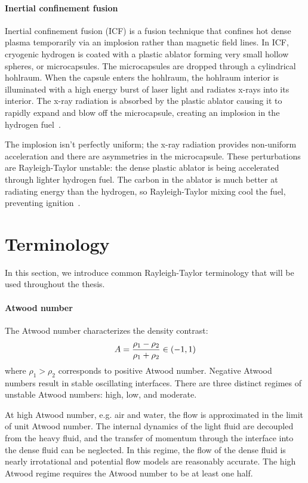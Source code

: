 \paragraph{Inertial confinement fusion}
Inertial confinement fusion (ICF) is a fusion technique that confines hot dense plasma temporarily via an implosion rather than magnetic field lines.
In ICF, cryogenic hydrogen is coated with a plastic ablator forming very small hollow spheres, or microcapsules.
The microcapsules are dropped through a cylindrical hohlraum.
When the capsule enters the hohlraum, the hohlraum interior is illuminated with a high energy burst of laser light and radiates x-rays into its interior.
The x-ray radiation is absorbed by the plastic ablator causing it to rapidly expand and blow off the microcapsule, creating an implosion in the hydrogen fuel~\cite{NASICF}.

The implosion isn't perfectly uniform; the x-ray radiation provides non-uniform acceleration and there are asymmetries in the microcapsule.
These perturbations are Rayleigh-Taylor unstable: the dense plastic ablator is being accelerated through lighter hydrogen fuel.
The carbon in the ablator is much better at radiating energy than the hydrogen, so Rayleigh-Taylor mixing cool the fuel, preventing ignition~\cite{goncharov2012panel}.

\section{Terminology}

In this section, we introduce common Rayleigh-Taylor terminology that will be used throughout the thesis.

\paragraph{Atwood number}
The Atwood number characterizes the density contrast:
\begin{equation} \elabel{atwood}
A = \frac{\rho_1 - \rho_2}{\rho_1 + \rho_2} \in (-1,1)
\end{equation}
where $\rho_1 > \rho_2$ corresponds to positive Atwood number.
Negative Atwood numbers result in stable oscillating interfaces.
There are three distinct regimes of unstable Atwood numbers: high, low, and moderate.

At high Atwood number, e.g. air and water, the flow is approximated in the limit of unit Atwood number.
The internal dynamics of the light fluid are decoupled from the heavy fluid, and the transfer of momentum through the interface into the dense fluid can be neglected.
In this regime, the flow of the dense fluid is nearly irrotational and potential flow models are reasonably accurate.
The high Atwood regime requires the Atwood number to be at least one half.

